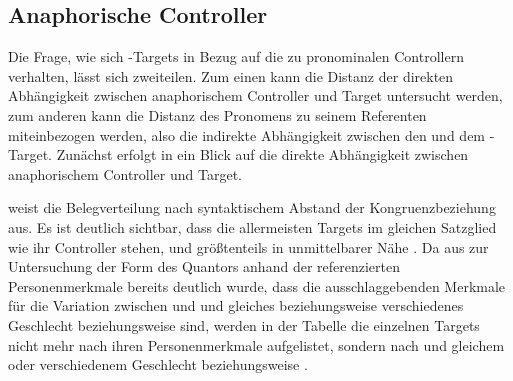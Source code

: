 \subsection{Anaphorische Controller}
\label{subsec:caodistanactrl}

Die Frage, wie sich -Targets in Bezug auf die  zu
pronominalen Controllern verhalten, lässt sich zweiteilen. Zum einen kann die
Distanz der direkten Abhängigkeit zwischen anaphorischem Controller und Target
untersucht werden, zum anderen kann die Distanz des
Pronomens zu seinem Referenten miteinbezogen werden, also die indirekte
Abhängigkeit zwischen den  und dem
-Target. Zunächst erfolgt in  ein Blick auf
die direkte Abhängigkeit zwischen anaphorischem Controller und Target.

 weist die Belegverteilung
nach syntaktischem Abstand der
Kongruenzbeziehung aus. Es ist deutlich sichtbar, dass
die allermeisten Targets im gleichen Satzglied wie ihr Controller stehen, und
größtenteils in unmittelbarer Nähe \autocite[vgl.][526--527]{ksw2}. Da aus
 zur Untersuchung der Form des Quantors 
anhand der referenzierten Personenmerkmale bereits deutlich wurde, dass die
ausschlaggebenden Merkmale für die Variation zwischen  und
  und gleiches beziehungsweise verschiedenes
Geschlecht beziehungsweise  sind, werden in der Tabelle die
einzelnen Targets nicht mehr nach ihren Personenmerkmale aufgelistet, sondern
nach  und gleichem oder verschiedenem Geschlecht
beziehungsweise .

